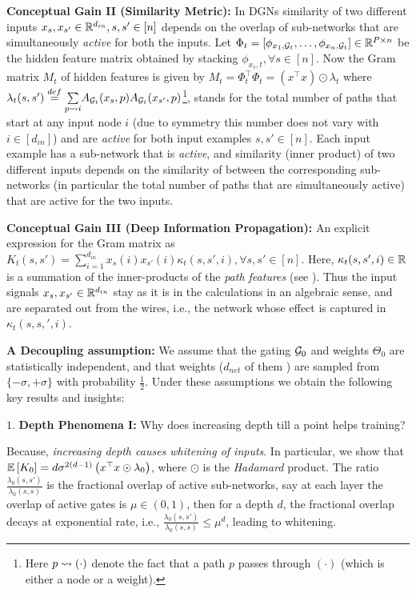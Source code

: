 \textbf{Conceptual Gain II (Similarity Metric):}  In DGNs similarity of two different inputs $x_s,x_{s'}\in \mathbb{R}^{d_{in}}, s,s' \in [n]$ depends on the overlap of sub-networks that are simultaneously \emph{active} for both the inputs. Let $\Phi_t=\left[\phi_{x_1,\mathcal{G}_t},\ldots,\phi_{x_n,\mathcal{G}_t}\right]\in\mathbb{R}^{P\times n}$ be the hidden feature matrix obtained by stacking $\phi_{x_s,t},\forall s\in[n]$. Now the Gram matrix $M_t$ of hidden features is given by $M_t=\Phi^\top_t\Phi_t=(x^\top x)\odot \lambda_t$ where $\lambda_t(s,s')\stackrel{def}=\underset{p\rightsquigarrow i}{\sum} A_{\mathcal{G}_t}(x_s,p) A_{\mathcal{G}_t}(x_{s'},p)$\footnote{Here $p\rightsquigarrow (\cdot)$ denote the fact that a path $p$ passes through $(\cdot)$ (which is either a node or a weight). },  stands for the total number of paths that start at any input node $i$ (due to symmetry this number does not vary with $i\in [d_{in}]$) and are \emph{active} for both input examples $s,s'\in[n]$. Each input example has a sub-network that is \emph{active}, and similarity (inner product) of two different inputs depends on the similarity of between the corresponding sub-networks (in particular the total number of paths that are simultaneously active) that are active for the two inputs. 


\textbf{Conceptual Gain III (Deep Information Propagation):} An explicit expression for the Gram matrix as $K_t(s,s')=\sum_{i=1}^{d_{in}} x_s(i) x_{s'}(i)\kappa_t(s,s',i), \forall s,s'\in[n]$. Here, $\kappa_t(s,s',i)\in \mathbb{R}$ is a summation of the inner-products of the \emph{path features} (see ). Thus the input signals $x_s,x_{s'}\in \mathbb{R}^{d_{in}}$ stay as it is in the calculations in an algebraic sense, and are separated out from the wires, i.e., the network whose effect is captured in $\kappa_t(s,s,',i)$.


\textbf{A Decoupling assumption:} We assume that the gating $\mathcal{G}_0$ and weights $\Theta_0$ are statistically independent, and that weights ($d_{net}$ of them ) are sampled from $\{-\sigma,+\sigma\}$ with probability $\frac{1}2$. Under these assumptions we obtain the following key results and insights:

$1.$ \textbf{Depth Phenomena I:} Why does increasing depth till a point helps training?

Because, \emph{increasing depth causes whitening of inputs}. In particular, we show that $\mathbb{E}\left[K_0\right]=d\sigma^{2(d-1)}\left(x^\top x \odot \lambda_0\right)$, where $\odot$ is the \emph{Hadamard} product. The ratio $\frac{{\lambda_0}(s,s')}{{\lambda_0}(s,s)}$ is the fractional overlap of active sub-networks, say at each layer the overlap of active gates is $\mu\in (0,1)$, then for a depth $d$, the fractional overlap decays at exponential rate, i.e., $\frac{{\lambda_0}(s,s')}{{\lambda_0}(s,s)}\leq \mu^d$, leading to whitening.

